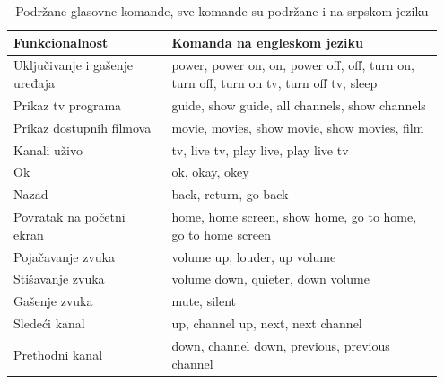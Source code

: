 \documentclass[implementacija.tex]{subfiles}
\begin{document}
\begin{table}
\centering
\caption{Podržane glasovne komande, sve komande su podržane i na srpskom jeziku}
\label{tbl:komande}
\begin{tabular}{p{0.35\linewidth} | p{0.6\linewidth}}
\toprule
Funkcionalnost & Komanda na engleskom jeziku\\
\toprule
Uključivanje i gašenje uređaja&power, power on, on, power off, off, turn on, turn off, turn on tv, turn off tv, sleep \\\midrule
Prikaz tv programa &guide, show guide, all channels, show channels \\\midrule
Prikaz dostupnih filmova&movie, movies, show movie, show movies, film\\\midrule
Kanali uživo&tv, live tv, play live, play live tv\\\midrule
Ok &ok, okay, okey\\\midrule
Nazad&back, return, go back\\\midrule
Povratak na početni ekran&home, home screen, show home, go to home, go to home screen\\\midrule
Pojačavanje zvuka&volume up, louder, up volume\\\midrule
Stišavanje zvuka&volume down, quieter, down volume\\\midrule
Gašenje zvuka&mute, silent\\\midrule
Sledeći kanal&up, channel up, next, next channel\\\midrule
Prethodni kanal&down, channel down, previous, previous channel\\
\bottomrule
\end{tabular}
\end{table}
\end{document}
